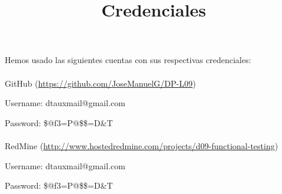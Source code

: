\documentclass[a4paper]{article}
\title{Credenciales}
\date{}
\begin{document}
\setlength{\voffset}{-1in}
\setlength{\textheight}{680px}
\setlength{\headsep}{30px}
\maketitle

Hemos usado las siguientes cuentas con sus respectivas credenciales:
\\
\\
GitHub (\url{https://github.com/JoseManuelG/DP-L09})

Username: dtauxmail@gmail.com

Password: \$@f3=P@\$\$=D\&T
\\
\\
RedMine (\url{http://www.hostedredmine.com/projects/d09-functional-testing})

Username: dtauxmail@gmail.com

Password: \$@f3=P@\$\$=D\&T
\end{document}
